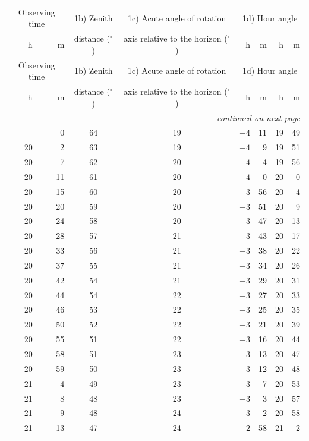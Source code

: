 \begin{center}
\small
\begin{longtable}{rr c c rr rr}
\toprule
\multicolumn{2}{c}{Observing time} & 1b) Zenith & 1c) Acute angle of rotation & \multicolumn{4}{c}{1d) Hour angle} \\
h & m & distance ($^\circ$) & axis relative to the horizon ($^\circ$) & h & m & h & m \\
\midrule
\endfirsthead
\toprule
\multicolumn{2}{c}{Observing time} & 1b) Zenith & 1c) Acute angle of rotation & \multicolumn{4}{c}{1d) Hour angle} \\
h & m & distance ($^\circ$) & axis relative to the horizon ($^\circ$) & h & m & h & m \\
\midrule
\endhead
\midrule
\multicolumn{8}{r}{\textit{continued on next page}} \\
\endfoot
\bottomrule
\endlastfoot
20 & 0 & 64 & 19 & $-4$ & 11 & 19 & 49 \\
20 & 2 & 63 & 19 & $-4$ & 9 & 19 & 51 \\
20 & 7 & 62 & 20 & $-4$ & 4 & 19 & 56 \\
20 & 11 & 61 & 20 & $-4$ & 0 & 20 & 0 \\
20 & 15 & 60 & 20 & $-3$ & 56 & 20 & 4 \\
20 & 20 & 59 & 20 & $-3$ & 51 & 20 & 9 \\
20 & 24 & 58 & 20 & $-3$ & 47 & 20 & 13 \\
20 & 28 & 57 & 21 & $-3$ & 43 & 20 & 17 \\
20 & 33 & 56 & 21 & $-3$ & 38 & 20 & 22 \\
20 & 37 & 55 & 21 & $-3$ & 34 & 20 & 26 \\
20 & 42 & 54 & 21 & $-3$ & 29 & 20 & 31 \\
20 & 44 & 54 & 22 & $-3$ & 27 & 20 & 33 \\
20 & 46 & 53 & 22 & $-3$ & 25 & 20 & 35 \\
20 & 50 & 52 & 22 & $-3$ & 21 & 20 & 39 \\
20 & 55 & 51 & 22 & $-3$ & 16 & 20 & 44 \\
20 & 58 & 51 & 23 & $-3$ & 13 & 20 & 47 \\
20 & 59 & 50 & 23 & $-3$ & 12 & 20 & 48 \\
21 & 4 & 49 & 23 & $-3$ & 7 & 20 & 53 \\
21 & 8 & 48 & 23 & $-3$ & 3 & 20 & 57 \\
21 & 9 & 48 & 24 & $-3$ & 2 & 20 & 58 \\
21 & 13 & 47 & 24 & $-2$ & 58 & 21 & 2 \\

\end{longtable}
\end{center}
